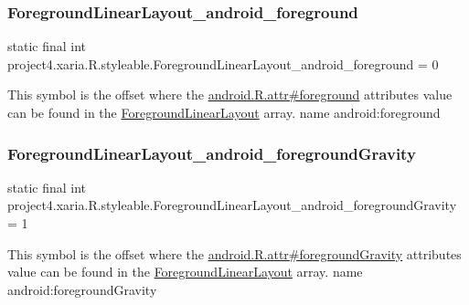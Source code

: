 \subsubsection{\texorpdfstring{Foreground\+Linear\+Layout\+\_\+android\+\_\+foreground}{ForegroundLinearLayout\_android\_foreground}}
{\footnotesize\ttfamily static final int project4.\+xaria.\+R.\+styleable.\+Foreground\+Linear\+Layout\+\_\+android\+\_\+foreground = 0\hspace{0.3cm}{\ttfamily [static]}}

This symbol is the offset where the \hyperlink{}{android.\+R.\+attr\#foreground} attribute\textquotesingle{}s value can be found in the \hyperlink{classproject4_1_1xaria_1_1R_1_1styleable_a32963533d4ea1b671544e3c531ad5f97}{Foreground\+Linear\+Layout} array.  name android\+:foreground \mbox{\label{classproject4_1_1xaria_1_1R_1_1styleable_acf255ff36098cb0688c9afd1841453dd}} 
\subsubsection{\texorpdfstring{Foreground\+Linear\+Layout\+\_\+android\+\_\+foreground\+Gravity}{ForegroundLinearLayout\_android\_foregroundGravity}}
{\footnotesize\ttfamily static final int project4.\+xaria.\+R.\+styleable.\+Foreground\+Linear\+Layout\+\_\+android\+\_\+foreground\+Gravity = 1\hspace{0.3cm}{\ttfamily [static]}}

This symbol is the offset where the \hyperlink{}{android.\+R.\+attr\#foreground\+Gravity} attribute\textquotesingle{}s value can be found in the \hyperlink{classproject4_1_1xaria_1_1R_1_1styleable_a32963533d4ea1b671544e3c531ad5f97}{Foreground\+Linear\+Layout} array.  name android\+:foreground\+Gravity \mbox{\label{classproject4_1_1xaria_1_1R_1_1styleable_a396d6deee9a0dba4405845d2d80299bf}} 
